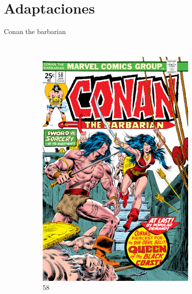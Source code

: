 \section{Adaptaciones}
\note[itemize]{
	\item
}

\begin{frame}{Conan the barbarian}
	\begin{columns}
		\begin{figure}[htb]
			\centering
			\begin{subfigure}[b]{0.4\textwidth}
				\includegraphics[width=\textwidth]{img/CTB058}
				\caption{58}
			\end{subfigure}
			~
			\begin{subfigure}[b]{0.4\textwidth}

\end{subfigure}
\end{figure}
\end{columns}
\end{frame}
